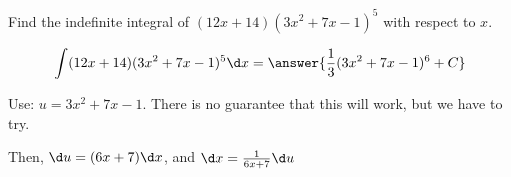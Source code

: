 \documentclass{ximera}
\author{Gregory Hartman \and Matthew Carr\and Nela Lakos}
\begin{document}
\begin{exercise}


Find the indefinite integral of $(12 x+14)(3 x^2+7 x-1)^5$ with respect to $x$.

\[
\int (12 x+14)(3 x^2+7 x-1)^5 \d x=\answer{\frac{1}{3} (3x^2+7x-1)^6+C}
\]

\begin{hint}
Use: $u=3 x^2+7 x-1$. There is no guarantee that this will work, but we have to try.
\end{hint}
\begin{hint}
Then, $\d u=(6 x+7)\d x $, and  $\d x=\frac{1}{6 x+7}\d u $
\end{hint}
\end{exercise}
\end{document}
